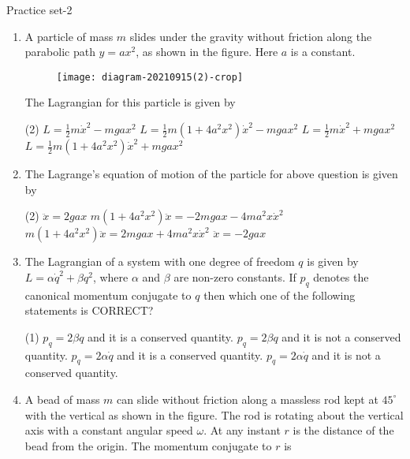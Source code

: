 \newpage
\begin{abox}
	Practice set-2
\end{abox}
\begin{enumerate}
	\item A particle of mass $m$ slides under the gravity without friction along the parabolic path $y=a x^{2}$, as shown in the figure. Here $a$ is a constant.\\
	\begin{figure}[H]
		\centering
		\texttt{[image: diagram-20210915(2)-crop]}
	\end{figure}
	The Lagrangian for this particle is given by
	{	}
	\begin{tasks}(2)
		\task[\textbf{A.}] $L=\frac{1}{2} m \dot{x}^{2}-m g a x^{2}$
		\task[\textbf{B.}] $L=\frac{1}{2} m\left(1+4 a^{2} x^{2}\right) \dot{x}^{2}-m g a x^{2}$
		\task[\textbf{C.}] $L=\frac{1}{2} m \dot{x}^{2}+m g a x^{2}$
		\task[\textbf{D.}] $L=\frac{1}{2} m\left(1+4 a^{2} x^{2}\right) \dot{x}^{2}+m g a x^{2}$
	\end{tasks}
	\item  The Lagrange's equation of motion of the particle for above question is given by
	{}
	\begin{tasks}(2)
		\task[\textbf{A.}] $\ddot{x}=2 g a x$
		\task[\textbf{B.}] $m\left(1+4 a^{2} x^{2}\right) \ddot{x}=-2 m g a x-4 m a^{2} x \dot{x}^{2}$
		\task[\textbf{C.}] $m\left(1+4 a^{2} x^{2}\right) \ddot{x}=2 m g a x+4 m a^{2} x \dot{x}^{2}$
		\task[\textbf{D.}] $\ddot{x}=-2 g a x$
	\end{tasks}
	\item The Lagrangian of a system with one degree of freedom $q$ is given by $L=\alpha \dot{q}^{2}+\beta q^{2}$, where $\alpha$ and $\beta$ are non-zero constants. If $p_{q}$ denotes the canonical momentum conjugate to $q$ then which one of the following statements is CORRECT?
	{}
	\begin{tasks}(1)
		\task[\textbf{A.}] $p_{q}=2 \beta q$ and it is a conserved quantity.
		\task[\textbf{B.}]  $p_{q}=2 \beta q$ and it is not a conserved quantity.
		\task[\textbf{C.}] $p_{q}=2 \alpha \dot{q}$ and it is a conserved quantity.
		\task[\textbf{D.}]  $p_{q}=2 \alpha \dot{q}$ and it is not a conserved quantity.
	\end{tasks}
	\item A bead of mass $m$ can slide without friction along a massless rod kept at $45^{\circ}$ with the vertical as shown in the figure. The rod is rotating about the vertical axis with a constant angular speed $\omega$. At any instant $r$ is the distance of the bead from the origin. The momentum conjugate to $r$ is

\end{enumerate}
